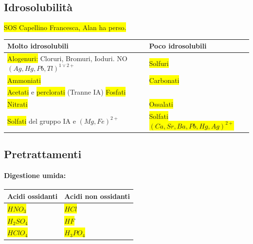 \documentclass{article}
\begin{document}
\subsection{Idrosolubilità}
\colorbox{yellow}{SOS Capellino Francesca, Alan ha perso.}
\begin{center}
\begin{tabular}{l|l}
	\toprule
	Molto idrosolubili & Poco idrosolubili \\
	\midrule
	\colorbox{yellow}{Alogenuri:} Cloruri, Bromuri, Ioduri. NO $(Ag, Hg, Pb, Tl)^{1\vee2+}$ &\colorbox{yellow}{ Solfuri} \\
	\colorbox{yellow}{Ammoniati} & \colorbox{yellow}{Carbonati} \\
	\colorbox{yellow}{Acetati} e \colorbox{yellow}{perclorati} (Tranne IA) \colorbox{yellow}{Fosfati} \\
	\colorbox{yellow}{Nitrati} & \colorbox{yellow}{Ossalati} \\
	\colorbox{yellow}{Solfati} del gruppo IA e $(Mg, Fe)^{2+}$ & \colorbox{yellow}{Solfati $(Ca, Sr, Ba, Pb, Hg, Ag)^{2+}$} \\
	\bottomrule
\end{tabular}
\end{center}

\subsection{Pretrattamenti}
\paragraph{Digestione umida:}
\begin{center}
\begin{tabular}{l|l}
	\toprule
	Acidi ossidanti & Acidi non ossidanti \\
	\midrule
	\colorbox{yellow}{$HNO_3$} & \colorbox{yellow}{$HCl$} \\
	\colorbox{yellow}{$H_2SO_4$} & \colorbox{yellow}{$HF$} \\
	\colorbox{yellow}{$HClO_4$} & \colorbox{yellow}{$H_3PO_4$} \\
	\bottomrule
\end{tabular}
\end{center}
\end{document}
